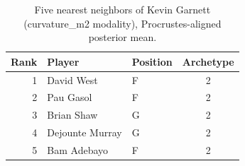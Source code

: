 \begin{table}[htbp]
  \centering\small
  \begin{tabular}{rllc}
    \toprule
    Rank & Player & Position & Archetype \\
    \midrule
    1 & David West & F & 2 \\
    2 & Pau Gasol & F & 2 \\
    3 & Brian Shaw & G & 2 \\
    4 & Dejounte Murray & G & 2 \\
    5 & Bam Adebayo & F & 2 \\
    \bottomrule
  \end{tabular}
  \caption{Five nearest neighbors of Kevin Garnett (curvature_m2 modality), Procrustes-aligned posterior mean.}
  \label{tab:Kevin_Garnett_neighbors_curvature_m2}
\end{table}

